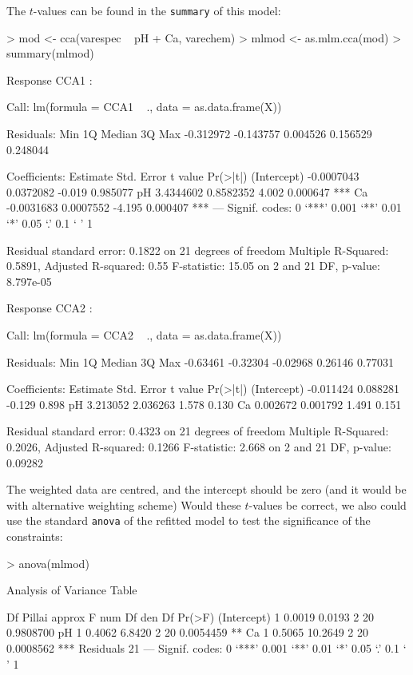 \documentclass[a4paper]{article}
\begin{document}
The $t$-values can be found in the \texttt{summary} of this model:
\begin{Schunk}
\begin{Sinput}
> mod <- cca(varespec ~ pH + Ca, varechem)
> mlmod <- as.mlm.cca(mod)
> summary(mlmod)
\end{Sinput}
\begin{Soutput}
Response CCA1 :

Call:
lm(formula = CCA1 ~ ., data = as.data.frame(X))

Residuals:
      Min        1Q    Median        3Q       Max 
-0.312972 -0.143757  0.004526  0.156529  0.248044 

Coefficients:
              Estimate Std. Error t value Pr(>|t|)    
(Intercept) -0.0007043  0.0372082  -0.019 0.985077    
pH           3.4344602  0.8582352   4.002 0.000647 ***
Ca          -0.0031683  0.0007552  -4.195 0.000407 ***
---
Signif. codes:  0 ‘***’ 0.001 ‘**’ 0.01 ‘*’ 0.05 ‘.’ 0.1 ‘ ’ 1 

Residual standard error: 0.1822 on 21 degrees of freedom
Multiple R-Squared: 0.5891,	Adjusted R-squared:  0.55 
F-statistic: 15.05 on 2 and 21 DF,  p-value: 8.797e-05 


Response CCA2 :

Call:
lm(formula = CCA2 ~ ., data = as.data.frame(X))

Residuals:
     Min       1Q   Median       3Q      Max 
-0.63461 -0.32304 -0.02968  0.26146  0.77031 

Coefficients:
             Estimate Std. Error t value Pr(>|t|)
(Intercept) -0.011424   0.088281  -0.129    0.898
pH           3.213052   2.036263   1.578    0.130
Ca           0.002672   0.001792   1.491    0.151

Residual standard error: 0.4323 on 21 degrees of freedom
Multiple R-Squared: 0.2026,	Adjusted R-squared: 0.1266 
F-statistic: 2.668 on 2 and 21 DF,  p-value: 0.09282 
\end{Soutput}
\end{Schunk}
The weighted data are centred, and the intercept should be zero (and
it would be with alternative weighting scheme) Would these $t$-values
be correct, we also could use the standard \texttt{anova} of the
refitted model to test the significance of the constraints:
\begin{Schunk}
\begin{Sinput}
> anova(mlmod)
\end{Sinput}
\begin{Soutput}
Analysis of Variance Table

            Df  Pillai approx F num Df den Df    Pr(>F)    
(Intercept)  1  0.0019   0.0193      2     20 0.9808700    
pH           1  0.4062   6.8420      2     20 0.0054459 ** 
Ca           1  0.5065  10.2649      2     20 0.0008562 ***
Residuals   21                                             
---
Signif. codes:  0 ‘***’ 0.001 ‘**’ 0.01 ‘*’ 0.05 ‘.’ 0.1 ‘ ’ 1 
\end{Soutput}
\end{Schunk}
\end{document}
